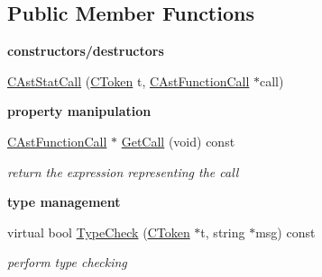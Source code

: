 \subsection*{Public Member Functions}
\begin{Indent}{\bf constructors/destructors}\par
\begin{DoxyCompactItemize}
\item 
\hyperlink{classCAstStatCall_a3d64c62f4c66b12c6b75c46b2c26ad0a}{C\-Ast\-Stat\-Call} (\hyperlink{classCToken}{C\-Token} t, \hyperlink{classCAstFunctionCall}{C\-Ast\-Function\-Call} $\ast$call)
\end{DoxyCompactItemize}
\end{Indent}
\begin{Indent}{\bf property manipulation}\par
\begin{DoxyCompactItemize}
\item 
\hyperlink{classCAstFunctionCall}{C\-Ast\-Function\-Call} $\ast$ \hyperlink{classCAstStatCall_a51d892e9c3a36c2b7ebbc3290963ff27}{Get\-Call} (void) const 
\begin{DoxyCompactList}\small\item\em return the expression representing the call \end{DoxyCompactList}\end{DoxyCompactItemize}
\end{Indent}
\begin{Indent}{\bf type management}\par
\begin{DoxyCompactItemize}
\item 
virtual bool \hyperlink{classCAstStatCall_a36d483642d8853410f0f263ce1d9190b}{Type\-Check} (\hyperlink{classCToken}{C\-Token} $\ast$t, string $\ast$msg) const 
\begin{DoxyCompactList}\small\item\em perform type checking \end{DoxyCompactList}\end{DoxyCompactItemize}
\end{Indent}
